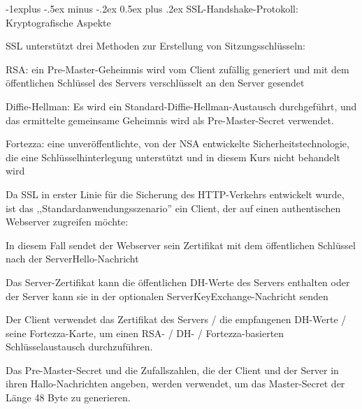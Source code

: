 \documentclass[a4paper]{article}
\makeatletter
\renewcommand{\subsection}{\@startsection{subsection}{2}{0mm}%
 {-1explus -.5ex minus -.2ex}%
 {0.5ex plus .2ex}%
 {\normalfont\normalsize\bfseries}}
\makeatother
\begin{document}
\begin{multicols}{3}
\begin{itemize*}
            \subsection{SSL-Handshake-Protokoll: Kryptografische
                  Aspekte}
            \begin{itemize*}
                  \item SSL unterstützt drei Methoden zur Erstellung von Sitzungsschlüsseln:
                  \begin{itemize*}
                        \item RSA: ein Pre-Master-Geheimnis wird vom Client zufällig generiert und mit dem öffentlichen Schlüssel des Servers verschlüsselt an den Server gesendet
                        \item Diffie-Hellman: Es wird ein Standard-Diffie-Hellman-Austausch durchgeführt, und das ermittelte gemeinsame Geheimnis wird als Pre-Master-Secret verwendet.
                        \item Fortezza: eine unveröffentlichte, von der NSA entwickelte Sicherheitstechnologie, die eine Schlüsselhinterlegung unterstützt und in diesem Kurs nicht behandelt wird
                  \end{itemize*}
                  \item Da SSL in erster Linie für die Sicherung des HTTP-Verkehrs entwickelt
                  wurde, ist das ,,Standardanwendungsszenario'' ein Client, der auf
                  einen authentischen Webserver zugreifen möchte:
                  \begin{itemize*}
                        \item In diesem Fall sendet der Webserver sein Zertifikat mit dem öffentlichen Schlüssel nach der ServerHello-Nachricht
                        \item Das Server-Zertifikat kann die öffentlichen DH-Werte des Servers enthalten oder der Server kann sie in der optionalen ServerKeyExchange-Nachricht senden
                        \item Der Client verwendet das Zertifikat des Servers / die empfangenen DH-Werte / seine Fortezza-Karte, um einen RSA- / DH- / Fortezza-basierten Schlüsselaustausch durchzuführen.
                  \end{itemize*}
                  \item Das Pre-Master-Secret und die Zufallszahlen, die der Client und der
                  Server in ihren Hallo-Nachrichten angeben, werden verwendet, um das
                  Master-Secret der Länge 48 Byte zu generieren.

\end{itemize*}
\end{itemize*}
\end{multicols}
\end{document}
